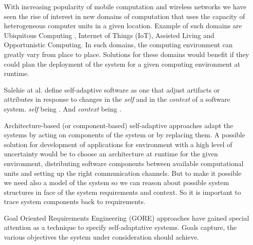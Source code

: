 

With increasing popularity of mobile computation and wireless networks we have seen the rise of  interest in new domains of computation that uses the capacity of heterogeneous computer units in a given location.
Example of such domains are Ubiquitous Computing \cite{bell_yesterdays_2007}, Internet of Things (IoT)\cite{atzori_internet_2010}, Assisted Living\cite{kleinberger_ambient_2007} and Opportunistic Computing\cite{smaldone_improving_2011}. In such domains, the computing environment can greatly vary from place to place.
Solutions for these domains would benefit if they could plan the deployment of the system for a given computing environment at runtime.

 Salehie at al. \cite{salehie_self-adaptive_2009} define self-adaptive software as one that adjust artifacts or attributes in response to changes in the \textit{self} and in the \textit{context} of a software system.
\textit{self} being . And \textit{context} being .

Architecture-based (or component-based) self-adaptive approaches adapt the systems by acting on components of the system or by replacing them\cite{garlan_software_2009}. A possible solution for development of applications for environment with a high level of uncertainty would be to choose an architecture at runtime for the given environment, distributing software components between available computational units and setting up the right communication channels. But to make it possible we need also a model of the system so we can reason about possible system structures in face of the system requirements and context.
So it is important to trace system components back to requirements.

Goal Oriented Requirements Engineering (GORE) approaches have gained special attention as a technique to specify self-adaptative systems\cite{morandini_goal-oriented_2009}.
Goals capture, the various objectives the system under consideration should achieve\cite{van_lamsweerde_goal-oriented_2001}.

